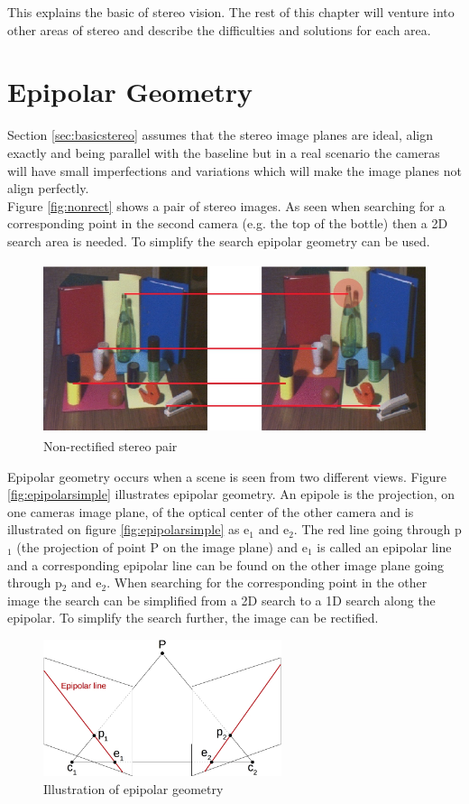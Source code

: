 This explains the basic of stereo vision. The rest of this chapter will venture into other areas of stereo and describe the difficulties and solutions for each area.

\section{Epipolar Geometry}
Section \ref{sec:basicstereo} assumes that the stereo image planes are ideal, align exactly and being parallel with the baseline but in a real scenario the cameras will have small imperfections and variations which will make the image planes not align perfectly.\\
 
Figure \vref{fig:nonrect} shows a pair of stereo images. As seen when searching for a corresponding point in the second camera (e.g. the top of the bottle) then a 2D search area is needed. To simplify the search epipolar geometry can be used. \\
\begin{figure}[ht!]
  \centering\includegraphics[height=5cm]{figures/nonrect.jpg}
  \caption{Non-rectified stereo pair\label{fig:nonrect} \cite{Mattoccia2013}}
\end{figure}

Epipolar geometry occurs when a scene is seen from two different views. Figure \vref{fig:epipolarsimple} illustrates epipolar geometry. An epipole is the projection, on one cameras image plane, of the optical center of the other camera and is illustrated on figure \vref{fig:epipolarsimple} as e$_1$ and e$_2$. The red line going through p$_1$ (the projection of point P on the image plane) and e$_1$ is called an epipolar line and a corresponding epipolar line can be found on the other image plane going through p$_2$ and e$_2$. When searching for the corresponding point in the other image the search can be simplified from a 2D search to a 1D search along the epipolar. To simplify the search further, the image can be rectified.\\
\begin{figure}[ht!]
  \centering
  \includegraphics[height=4cm]{figures/epipolarsimple}
  \caption{Illustration of epipolar geometry}
  \label{fig:epipolarsimple}
\end{figure}

